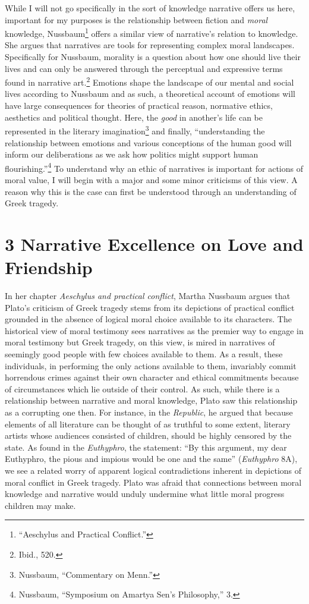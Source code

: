 \documentclass[phdthesis,12pt,final]{wuthesis}
\theoremstyle{definition}
\theoremstyle{definition}
\theoremstyle{definition}
\theoremstyle{definition}
\theoremstyle{remark}
\begin{document}
While I will not go specifically in the sort of knowledge narrative offers us here, important for my purposes is the relationship between fiction and \emph{moral} knowledge, Nussbaum\footnote{{``Aeschylus and Practical Conflict.''}} offers a similar view of narrative's relation to knowledge. She argues that narratives are tools for representing complex moral landscapes. Specifically for Nussbaum, morality is a question about how one should live their lives and can only be answered through the perceptual and expressive terms found in narrative art.\footnote{Ibid., 520.} Emotions shape the landscape of our mental and social lives according to Nussbaum and as such, a theoretical account of emotions will have large consequences for theories of practical reason, normative ethics, aesthetics and political thought. Here, the \emph{good} in another's life can be represented in the literary imagination\footnote{Nussbaum, {``Commentary on {Menn}.''}} and finally, ``understanding the relationship between emotions and various conceptions of the human good will inform our deliberations as we ask how politics might support human flourishing.''\footnote{Nussbaum, {``Symposium on {Amartya Sen}'s Philosophy,''} 3.} To understand why an ethic of narratives is important for actions of moral value, I will begin with a major and some minor criticisms of this view. A reason why this is the case can first be understood through an understanding of Greek tragedy.

\section{3 Narrative Excellence on Love and Friendship}\label{narrative-excellence-on-love-and-friendship}

In her chapter \emph{Aeschylus and practical conflict}, Martha Nussbaum argues that Plato's criticism of Greek tragedy stems from its depictions of practical conflict grounded in the absence of logical moral choice available to its characters. The historical view of moral testimony sees narratives as the premier way to engage in moral testimony but Greek tragedy, on this view, is mired in narratives of seemingly good people with few choices available to them. As a result, these individuals, in performing the only actions available to them, invariably commit horrendous crimes against their own character and ethical commitments because of circumstances which lie outside of their control. As such, while there is a relationship between narrative and moral knowledge, Plato saw this relationship as a corrupting one then. For instance, in the \emph{Republic}, he argued that because elements of all literature can be thought of as truthful to some extent, literary artists whose audiences consisted of children, should be highly censored by the state. As found in the \emph{Euthyphro}, the statement: ``By this argument, my dear Euthyphro, the pious and impious would be one and the same'' (\emph{Euthyphro} 8A), we see a related worry of apparent logical contradictions inherent in depictions of moral conflict in Greek tragedy. Plato was afraid that connections between moral knowledge and narrative would unduly undermine what little moral progress children may make.
\end{document}
